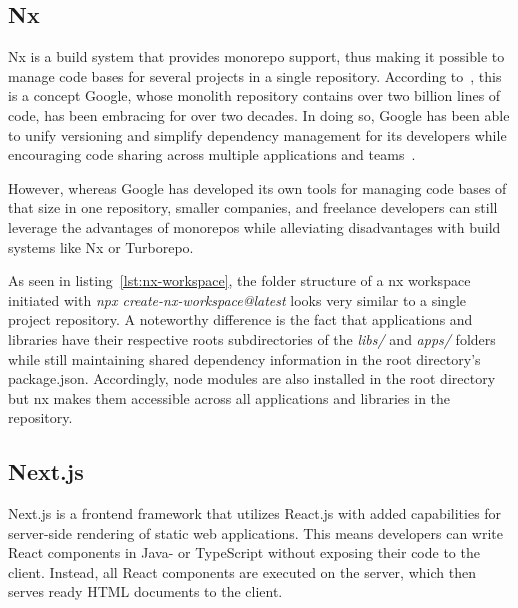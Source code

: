 \subsection{Nx}\label{subsec:nx}

Nx is a build system that provides monorepo support, thus making it possible to manage code bases for several projects in a single repository.
According to~\autocite[80]{potvin_why_2016}, this is a concept Google, whose monolith repository contains over two billion lines of code, has been embracing for over two decades.
In doing so, Google has been able to unify versioning and simplify dependency management for its developers while encouraging code sharing across multiple applications and teams~\autocite[84]{potvin_why_2016}.

However, whereas Google has developed its own tools for managing code bases of that size in one repository, smaller companies, and freelance developers can still leverage the advantages of monorepos while alleviating disadvantages with build systems like Nx or Turborepo.


As seen in listing~\ref{lst:nx-workspace}, the folder structure of a nx workspace initiated with \emph{npx create-nx-workspace@latest} looks very similar to a single project repository.
A noteworthy difference is the fact that applications and libraries have their respective roots subdirectories of the \emph{libs/} and \emph{apps/} folders while still maintaining shared dependency information in the root directory's package.json.
Accordingly, node modules are also installed in the root directory but nx makes them accessible across all applications and libraries in the repository.


\subsection{Next.js}\label{subsec:next.js}

Next.js is a frontend framework that utilizes React.js with added capabilities for server-side rendering of static web applications.
This means developers can write React components in Java- or TypeScript without exposing their code to the client.
Instead, all React components are executed on the server, which then serves ready \gls{HTML} documents to the client.

